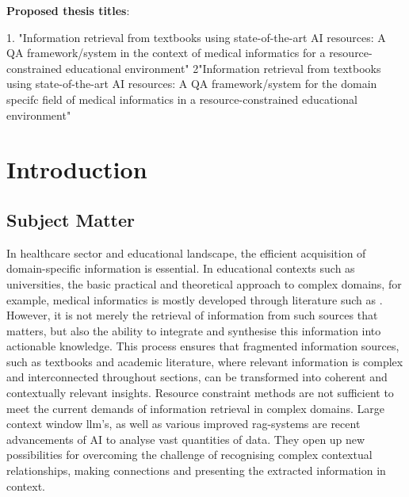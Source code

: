 \textbf{Proposed thesis titles}:

1. "Information retrieval from textbooks using state-of-the-art AI resources: 
A QA framework/system in the context of medical informatics for a resource-constrained educational environment"
2"Information retrieval from textbooks using state-of-the-art AI resources: 
A QA framework/system for the domain specifc field of medical informatics in a resource-constrained educational environment"
%
\chapter{Introduction}\label{ch:introduction}
\section{Subject Matter}
In healthcare sector and educational landscape, the efficient acquisition of domain-specific information is essential. 
In educational contexts such as universities, the basic practical and theoretical approach to complex domains, for example, medical informatics is mostly developed through literature such as \citet{bb2}.
However, it is not merely the retrieval of information from such sources that matters, but also the ability to integrate and synthesise this information into actionable knowledge.
This process ensures that fragmented information sources, such as textbooks and academic literature, where relevant information is complex and interconnected throughout sections, can be transformed into coherent and contextually relevant insights.
Resource constraint methods are not sufficient to meet the current demands of information retrieval in complex domains. 
%
Large context window \ac{llm}'s, as well as various improved \ac{rag}-systems are recent advancements of AI to analyse vast quantities of data.
They open up new possibilities for overcoming the challenge of recognising complex contextual relationships, making connections and presenting the extracted information in context.
%
